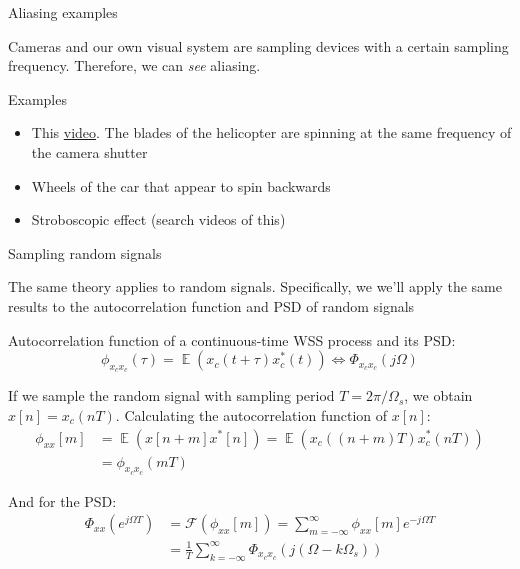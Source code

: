 \documentclass[10pt]{beamer}
\DeclareMathOperator{\E}{\mathbb{E}} %
\begin{document}
%
\begin{frame}{Aliasing examples}

Cameras and our own visual system are sampling devices with a certain sampling frequency. Therefore, we can \textit{see} aliasing.

\begin{block}{Examples}
	\begin{itemize}
		\item This \href{https://www.youtube.com/watch?v=R-IVw8OKjvQ}{video}. 		
		The blades of the helicopter are spinning at the same frequency of the camera shutter
		\item Wheels of the car that appear to spin backwards
		\item Stroboscopic effect (search videos of this)
	\end{itemize}
\end{block}
\end{frame}

%
\begin{frame}{Sampling random signals}

The same theory applies to random signals. Specifically, we we'll apply the same results to the autocorrelation function and PSD of random signals

Autocorrelation function of a continuous-time WSS process and its PSD:
\begin{equation*}
\phi_{x_cx_c}(\tau) = \E(x_c(t+\tau)x_c^*(t)) \Longleftrightarrow \Phi_{x_cx_c}(j\Omega)
\end{equation*}

If we sample the random signal with sampling period $T = 2\pi/\Omega_s$, we obtain $x[n] = x_c(nT)$. Calculating the autocorrelation function of $x[n]$:
\begin{align*}
\phi_{xx}[m] &= \E(x[n+m]x^*[n]) = \E(x_c((n+m)T)x_c^*(nT)) \\
&= \phi_{x_cx_c}(mT) \tag{the autocorrelation is sampled}
\end{align*}

And for the PSD:
\begin{align*}
\Phi_{xx}(e^{j\Omega T}) &= \mathcal{F}(\phi_{xx}[m]) = \sum_{m=-\infty}^{\infty}\phi_{xx}[m]e^{-j\Omega T} \\
&= \frac{1}{T}\sum_{k=-\infty}^{\infty}\Phi_{x_cx_c}(j(\Omega-k\Omega_s)) \tag{the PSD is replicated with period $\Omega_s$}
\end{align*}

\end{frame}
\end{document}
